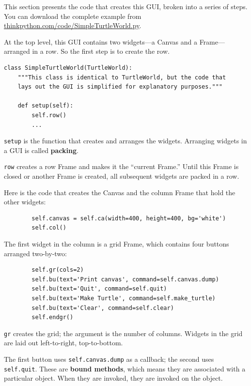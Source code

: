 \documentclass[10pt]{book}
\begin{document}
{This section presents the code that creates this GUI, broken into a
series of steps.  You can download the complete example
from \url{thinkpython.com/code/SimpleTurtleWorld.py}.

At the top level, this GUI contains two widgets---a Canvas and a
Frame---arranged in a row.  So the first step is to create the row.


\beforeverb
\begin{verbatim}
class SimpleTurtleWorld(TurtleWorld):
    """This class is identical to TurtleWorld, but the code that
    lays out the GUI is simplified for explanatory purposes."""

    def setup(self):
        self.row()
        ...
\end{verbatim}
\afterverb
%
{\tt setup} is the function that creates and arranges the widgets.
Arranging widgets in a GUI is called {\bf packing}.


{\tt row} creates a row Frame and makes it the ``current Frame.''
Until this Frame is closed or another Frame is created, all
subsequent widgets are packed in a row.

Here is the code that creates the Canvas and the column Frame
that hold the other widgets:

\beforeverb
\begin{verbatim}
        self.canvas = self.ca(width=400, height=400, bg='white')
        self.col()
\end{verbatim}
\afterverb
%
The first widget in the column is a grid Frame, which contains
four buttons arranged two-by-two:

\beforeverb
\begin{verbatim}
        self.gr(cols=2)
        self.bu(text='Print canvas', command=self.canvas.dump)
        self.bu(text='Quit', command=self.quit)
        self.bu(text='Make Turtle', command=self.make_turtle)
        self.bu(text='Clear', command=self.clear)
        self.endgr()
\end{verbatim}
\afterverb
%
{\tt gr} creates the grid; the argument is the number of
columns.  Widgets in the grid are
laid out left-to-right, top-to-bottom.


The first button uses {\tt self.canvas.dump} as a callback; the second
uses {\tt self.quit}.  These are {\bf bound methods}, which means they
are associated with a particular object.  When they are invoked, they
are invoked on the object.

}
\end{document}
